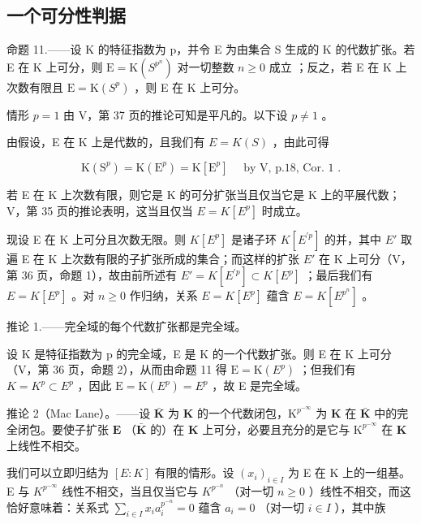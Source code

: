 \subsection{一个可分性判据}

命题 11.——设 K 的特征指数为 p，并令 E 为由集合 S 生成的 K 的代数扩张。若 E 在 K 上可分，则 \(\mathrm{E} = \mathrm{K}(S^{p^{n}})\) 对一切整数 \(n \geqslant 0\) 成立 ；反之，若 E 在 K 上次数有限且 \(\mathrm{E} = \mathrm{K}(S^{p})\) ，则 E 在 K 上可分。

情形 \(p = 1\) 由 V，第 37 页的推论可知是平凡的。以下设 \(p \neq 1\) 。

由假设，E 在 K 上是代数的，且我们有 \(E = K(S)\) ，由此可得

\[
\mathrm{K} \left(\mathrm{S} ^ {p}\right) = \mathrm{K} \left(\mathrm{E} ^ {p}\right) = \mathrm{K} \left[ \mathrm{E} ^ {p} \right] \quad \text { by   V,   p.18,   Cor.   1 }.
\]

若 E 在 K 上次数有限，则它是 K 的可分扩张当且仅当它是 K 上的平展代数；V，第 35 页的推论表明，这当且仅当 \(E = K[E^{p}]\) 时成立。

现设 E 在 K 上可分且次数无限。则 \(K[E^{p}]\) 是诸子环 \(K[E^{\prime p}]\) 的并，其中 \(E'\) 取遍 E 在 K 上次数有限的子扩张所成的集合；而这样的扩张 \(E'\) 在 K 上可分（V，第 36 页，命题 1），故由前所述有 \(E' = K[E^{\prime p}] \subset K[E^{p}]\) ；最后我们有 \(E = K[E^{p}]\) 。对 \(n \geqslant 0\) 作归纳，关系 \(E = K[E^{p}]\) 蕴含 \(E = K[E^{p^{n}}]\) 。

推论 1.——完全域的每个代数扩张都是完全域。

设 K 是特征指数为 p 的完全域，E 是 K 的一个代数扩张。则 E 在 K 上可分（V，第 36 页，命题 2），从而由命题 11 得 \(\mathrm{E} = \mathrm{K}(E^{p})\) ；但我们有 \(K = K^{p} \subset E^{p}\) ，因此 \(\mathrm{E} = \mathrm{K}(E^{p}) = E^{p}\) ，故 E 是完全域。

推论 2（Mac Lane）。——设 \(\bar{\mathbf{K}}\) 为 \(\mathbf{K}\) 的一个代数闭包，\(\mathrm{K}^{p^{-\infty}}\) 为 \(\mathbf{K}\) 在 \(\bar{\mathbf{K}}\) 中的完全闭包。要使子扩张 \(\mathbf{E}\) （\(\bar{\mathbf{K}}\) 的）在 \(\mathbf{K}\) 上可分，必要且充分的是它与 \(\mathrm{K}^{p^{-\infty}}\) 在 \(\mathbf{K}\) 上线性不相交。

我们可以立即归结为 \([E:K]\) 有限的情形。设 \((x_{i})_{i\in I}\) 为 E 在 K 上的一组基。E 与 \(K^{p^{-\infty}}\) 线性不相交，当且仅当它与 \(K^{p^{-n}}\) （对一切 \(n\geqslant0\) ）线性不相交，而这恰好意味着：关系式 \(\sum_{i\in I}x_{i}a_{i}^{p^{-n}}=0\) 蕴含 \(a_{i}=0\) （对一切 \(i\in I\) ），其中族

